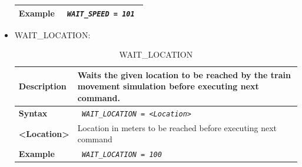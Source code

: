 \documentclass{template/openetcs}
\begin{document}
\begin{itemize}
\begin{longtable}{|l|l|}
			\hline
				
				\begin{minipage}[t]{0.22\linewidth} \textbf{Example} \end{minipage}
			&	\begin{minipage}[t]{0.78\linewidth}	\emph{\texttt{ WAIT\_SPEED = 101 }} \end{minipage} \\
			
			\hline\hline
			
		\end{longtable}
		
	\item WAIT\_LOCATION:
										
		\begin{longtable}{|l|l|}
		\caption{WAIT\_LOCATION}\\ 
		
			\hline						
				
				\begin{minipage}[t]{0.22\linewidth} \textbf{Description} \end{minipage} 
			&	\begin{minipage}[t]{0.78\linewidth} Waits the given location to be reached by the train movement simulation before executing next command. \end{minipage} \\
						
			\hline
									
				\begin{minipage}[t]{0.22\linewidth} \textbf{Syntax}	\end{minipage}
			&	\begin{minipage}[t]{0.78\linewidth} \emph{\texttt{ WAIT\_LOCATION = <Location>}} \end{minipage} \\
			
			\hline
			
				\begin{minipage}[t]{0.22\linewidth} \textbf{<Location>} \end{minipage}
			&	\begin{minipage}[t]{0.78\linewidth} Location in meters to be reached before executing next command \end{minipage} \\
			
			\hline
				
				\begin{minipage}[t]{0.22\linewidth} \textbf{Example} \end{minipage}
			&	\begin{minipage}[t]{0.78\linewidth} \emph{\texttt{ WAIT\_LOCATION = 100 }} \end{minipage} \\
			

\end{longtable}
\end{itemize}
\end{document}
